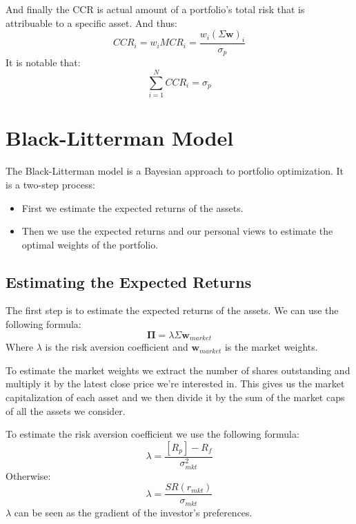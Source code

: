 \documentclass[11pt,a4paper]{article}
\begin{document}
And finally the CCR is actual amount of a portfolio's total risk that is attribuable to a specific asset. And thus:
\begin{equation}
    CCR_i = w_i MCR_i = \frac{w_i (\Sigma \mathbf{w})_i}{\sigma_p}
\end{equation}
It is notable that:
\begin{equation}
\sum_{i=1}^N CCR_i = \sigma_p
\end{equation}






\section{Black-Litterman Model}

The Black-Litterman model is a Bayesian approach to portfolio optimization.
It is a two-step process:
\begin{itemize}
    \item First we estimate the expected returns of the assets.
    \item Then we use the expected returns and our personal views to estimate the optimal weights of the portfolio.
\end{itemize}

\subsection{Estimating the Expected Returns}
The first step is to estimate the expected returns of the assets.
We can use the following formula:
\begin{equation}
    \bm{\Pi} = \lambda \Sigma \mathbf{w}_{market}
\end{equation}
\noindent
Where $\lambda$ is the risk aversion coefficient and $\mathbf{w}_{market}$ is the market weights.

To estimate the market weights we extract the number of shares outstanding and multiply it by the latest close price we're interested in.
This gives us the market capitalization of each asset and we then divide it by the sum of the market caps of all the assets we consider.

To estimate the risk aversion coefficient we use the following formula:
\begin{equation}
    \lambda = \frac{[R_p] - R_f}{\sigma_{mkt}^2}
\end{equation}
Otherwise:
\begin{equation}
    \lambda = \frac{SR(r_{mkt})}{\sigma_{mkt}}
\end{equation}
$\lambda$ can be seen as the gradient of the investor's preferences.
\end{document}
